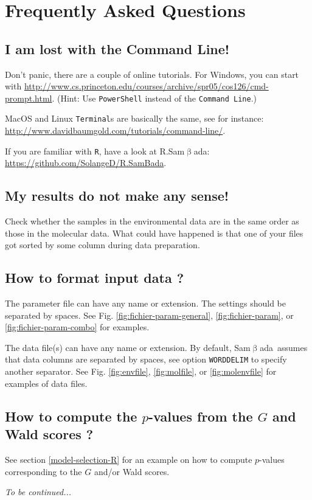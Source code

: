 \documentclass[a4paper,11pt]{article}
\newcommand{\smb}{\textsf{Sam$\upbeta$ada}}
\newcommand{\prog}[1]{\texttt{#1}}
\begin{document}
\section{Frequently Asked Questions}

\subsection*{I am lost with the Command Line! \label{faq:commandline}}
Don't panic, there are a couple of online tutorials.
For Windows, you can start with \url{http://www.cs.princeton.edu/courses/archive/spr05/cos126/cmd-prompt.html}.
(Hint: Use \prog{PowerShell} instead of the \prog{Command Line}.)

MacOS and Linux \prog{Terminal}s are basically the same, see for instance: \url{http://www.davidbaumgold.com/tutorials/command-line/}. 

If you are familiar with \prog{R}, have a look at \textsf{R.Sam$\upbeta$ada}: \url{https://github.com/SolangeD/R.SamBada}.

\subsection*{My results do not make any sense! \label{faq:nonsense}}
Check whether the samples in the environmental data are in the same order as those in the molecular data.
What could have happened is that one of your files got sorted by some column during data preparation.

\subsection*{How to format input data ?}
The parameter file can have any name or extension. The settings should be separated by spaces. See Fig. \ref{fig:fichier-param-general}, \ref{fig:fichier-param}, or \ref{fig:fichier-param-combo} for examples.

The data file(s) can have any name or extension. By default, \smb\ assumes that data columns are separated by spaces, see option \texttt{WORDDELIM} to specify another separator. See Fig. \ref{fig:envfile}, \ref{fig:molfile}, or \ref{fig:molenvfile} for examples of data files.

\subsection*{How to compute the $p$-values from the $G$ and Wald scores ?}

See section \ref{model-selection-R} for an example on how to compute $p$-values corresponding to the $G$ and/or Wald scores.

\label{sec:data}

\vspace{1cm}

\textit{To be continued...}
\clearpage

\printbibliography[heading=bibintoc]
\end{document}

